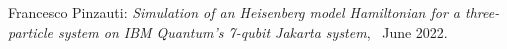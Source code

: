 \thispagestyle{empty}

\hfill

\vfill

\noindent Francesco Pinzauti: \textit{Simulation of an Heisenberg model Hamiltonian for a three-particle
system on IBM Quantum's 7-qubit Jakarta system}, \textcopyright\ June 2022.
